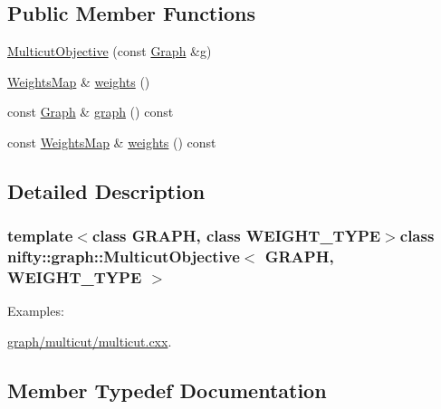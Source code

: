 \subsection*{Public Member Functions}
\begin{DoxyCompactItemize}
\item 
\hyperlink{classnifty_1_1graph_1_1MulticutObjective_a8c42407ab6a6c8135d3b0c5b71046903}{Multicut\+Objective} (const \hyperlink{classnifty_1_1graph_1_1MulticutObjective_a041c561c434976179cbe5a3aebd4dac3}{Graph} \&g)
\item 
\hyperlink{classnifty_1_1graph_1_1MulticutObjective_a3c05717ad6cce1e8bc07ebbdb99480fe}{Weights\+Map} \& \hyperlink{classnifty_1_1graph_1_1MulticutObjective_a13eedeb7292cf1676fdb5abdbd2c3545}{weights} ()
\item 
const \hyperlink{classnifty_1_1graph_1_1MulticutObjective_a041c561c434976179cbe5a3aebd4dac3}{Graph} \& \hyperlink{classnifty_1_1graph_1_1MulticutObjective_aa92e125898d8c42686f143d328820093}{graph} () const 
\item 
const \hyperlink{classnifty_1_1graph_1_1MulticutObjective_a3c05717ad6cce1e8bc07ebbdb99480fe}{Weights\+Map} \& \hyperlink{classnifty_1_1graph_1_1MulticutObjective_aa905875fef0c30f1d19fbea60b0a660c}{weights} () const 
\end{DoxyCompactItemize}


\subsection{Detailed Description}
\subsubsection*{template$<$class G\+R\+A\+P\+H, class W\+E\+I\+G\+H\+T\+\_\+\+T\+Y\+P\+E$>$class nifty\+::graph\+::\+Multicut\+Objective$<$ G\+R\+A\+P\+H, W\+E\+I\+G\+H\+T\+\_\+\+T\+Y\+P\+E $>$}

\begin{Desc}
\item[Examples\+: ]\par
\hyperlink{graph_2multicut_2multicut_8cxx-example}{graph/multicut/multicut.\+cxx}.\end{Desc}


\subsection{Member Typedef Documentation}
\hypertarget{classnifty_1_1graph_1_1MulticutObjective_a041c561c434976179cbe5a3aebd4dac3}{}
